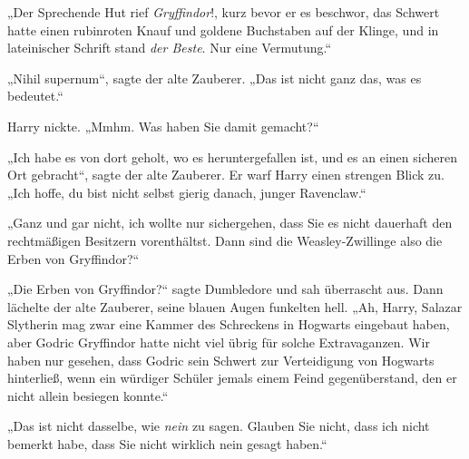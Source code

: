 „Der Sprechende Hut rief \emph{Gryffindor}!, kurz bevor er es beschwor, das Schwert hatte einen rubinroten Knauf und goldene Buchstaben auf der Klinge, und in lateinischer Schrift stand \emph{der Beste}. Nur eine Vermutung.“

„Nihil supernum“, sagte der alte Zauberer. „Das ist nicht ganz das, was es bedeutet.“

Harry nickte. „Mmhm. Was haben Sie damit gemacht?“

„Ich habe es von dort geholt, wo es heruntergefallen ist, und es an einen sicheren Ort gebracht“, sagte der alte Zauberer. Er warf Harry einen strengen Blick zu. „Ich hoffe, du bist nicht selbst gierig danach, junger Ravenclaw.“

„Ganz und gar nicht, ich wollte nur sichergehen, dass Sie es nicht dauerhaft den rechtmäßigen Besitzern vorenthältst. Dann sind die Weasley-Zwillinge also die Erben von Gryffindor?“

„Die Erben von Gryffindor?“ sagte Dumbledore und sah überrascht aus.
Dann lächelte der alte Zauberer, seine blauen Augen funkelten hell.
„Ah, Harry, Salazar Slytherin mag zwar eine Kammer des Schreckens in Hogwarts eingebaut haben, aber Godric Gryffindor hatte nicht viel übrig für solche Extravaganzen. Wir haben nur gesehen, dass Godric sein Schwert zur Verteidigung von Hogwarts hinterließ, wenn ein würdiger Schüler jemals einem Feind gegenüberstand, den er nicht allein besiegen konnte.“

„Das ist nicht dasselbe, wie \emph{nein} zu sagen. Glauben Sie nicht, dass ich nicht bemerkt habe, dass Sie nicht wirklich nein gesagt haben.“

